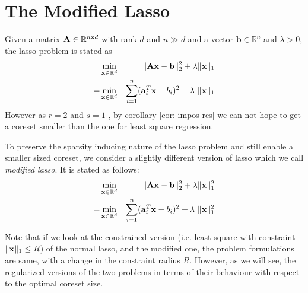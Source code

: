 \section{The Modified Lasso}
Given  a matrix $ \mathbf{A} \in {\mathbb{R}}^{n \mathbf{x}d}$ with rank $d$ and $n \gg d$ and a vector $\mathbf{b} \in \mathbb{R} ^ n $ and $\lambda > 0$, the lasso problem is stated as
\begin{eqnarray*}
&\min _{\mathbf{x} \in \mathbb{R}^d}& \|\mathbf{Ax} - \mathbf{b}\|_2^2 + \lambda \|\mathbf{x}\|_1\\
=&\min _{\mathbf{x} \in \mathbb{R}^d}& {\sum_{i=1}^n (\mathbf{a}_i^T\mathbf{x} - b_i)^2} + \lambda~\|\mathbf{x}\|_1
\end{eqnarray*}
However as $r=2$ and $s=1$ , by corollary \ref{cor: impos res} we can not hope to get a coreset smaller than the one for least square regression. %

To  preserve the sparsity inducing nature of the lasso problem and still enable a smaller sized coreset, we consider a slightly different version of lasso  which we call {\em modified lasso}. It is stated as follows:
\begin{eqnarray*}
&\min _{\mathbf{x} \in \mathbb{R}^d}& \|\mathbf{Ax} - \mathbf{b}\|_2^2 + \lambda \|\mathbf{x}\|_1^2 \\
=&\min _{\mathbf{x} \in \mathbb{R}^d}& {\sum_{i=1}^n (\mathbf{a}_i^T\mathbf{x} - b_i)^2} + \lambda~\|\mathbf{x}\|_1^2
\end{eqnarray*}

Note that if we look at the constrained version (i.e. least square with constraint $\|\mathbf{x}\|_1 \le R$) of the normal lasso, and the modified one, the problem formulations are same, with a change in the constraint radius $R$. However, as we will see, the regularized versions of the two problems in terms of their behaviour with respect to the optimal coreset size. 


